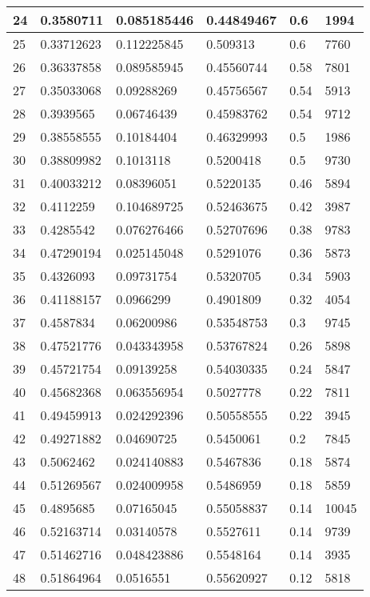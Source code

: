 \begin{longtable}{|l|l|l|l|l|l|}
24 & 0.3580711 & 0.085185446 & 0.44849467 & 0.6 & 1994 \\ \hline 
25 & 0.33712623 & 0.112225845 & 0.509313 & 0.6 & 7760 \\ \hline 
26 & 0.36337858 & 0.089585945 & 0.45560744 & 0.58 & 7801 \\ \hline 
27 & 0.35033068 & 0.09288269 & 0.45756567 & 0.54 & 5913 \\ \hline 
28 & 0.3939565 & 0.06746439 & 0.45983762 & 0.54 & 9712 \\ \hline 
29 & 0.38558555 & 0.10184404 & 0.46329993 & 0.5 & 1986 \\ \hline 
30 & 0.38809982 & 0.1013118 & 0.5200418 & 0.5 & 9730 \\ \hline 
31 & 0.40033212 & 0.08396051 & 0.5220135 & 0.46 & 5894 \\ \hline 
32 & 0.4112259 & 0.104689725 & 0.52463675 & 0.42 & 3987 \\ \hline 
33 & 0.4285542 & 0.076276466 & 0.52707696 & 0.38 & 9783 \\ \hline 
34 & 0.47290194 & 0.025145048 & 0.5291076 & 0.36 & 5873 \\ \hline 
35 & 0.4326093 & 0.09731754 & 0.5320705 & 0.34 & 5903 \\ \hline 
36 & 0.41188157 & 0.0966299 & 0.4901809 & 0.32 & 4054 \\ \hline 
37 & 0.4587834 & 0.06200986 & 0.53548753 & 0.3 & 9745 \\ \hline 
38 & 0.47521776 & 0.043343958 & 0.53767824 & 0.26 & 5898 \\ \hline 
39 & 0.45721754 & 0.09139258 & 0.54030335 & 0.24 & 5847 \\ \hline 
40 & 0.45682368 & 0.063556954 & 0.5027778 & 0.22 & 7811 \\ \hline 
41 & 0.49459913 & 0.024292396 & 0.50558555 & 0.22 & 3945 \\ \hline 
42 & 0.49271882 & 0.04690725 & 0.5450061 & 0.2 & 7845 \\ \hline 
43 & 0.5062462 & 0.024140883 & 0.5467836 & 0.18 & 5874 \\ \hline 
44 & 0.51269567 & 0.024009958 & 0.5486959 & 0.18 & 5859 \\ \hline 
45 & 0.4895685 & 0.07165045 & 0.55058837 & 0.14 & 10045 \\ \hline 
46 & 0.52163714 & 0.03140578 & 0.5527611 & 0.14 & 9739 \\ \hline 
47 & 0.51462716 & 0.048423886 & 0.5548164 & 0.14 & 3935 \\ \hline 
48 & 0.51864964 & 0.0516551 & 0.55620927 & 0.12 & 5818 \\ \hline 

\end{longtable}
